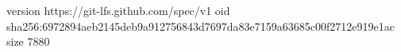 version https://git-lfs.github.com/spec/v1
oid sha256:6972894aeb2145deb9a912756843d7697da83e7159a63685c00f2712e919e1ac
size 7880
